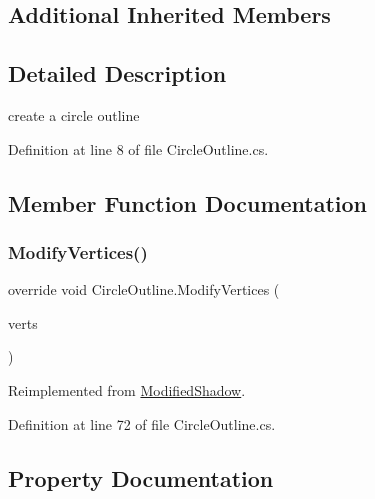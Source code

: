 \subsection*{Additional Inherited Members}


\subsection{Detailed Description}
create a circle outline 



Definition at line 8 of file Circle\+Outline.\+cs.



\subsection{Member Function Documentation}
\mbox{\label{class_circle_outline_a60ecaf1389896d2bca9b38c8767ca20a}} 
\subsubsection{\texorpdfstring{Modify\+Vertices()}{ModifyVertices()}}
{\footnotesize\ttfamily override void Circle\+Outline.\+Modify\+Vertices (\begin{DoxyParamCaption}\item[{List$<$ U\+I\+Vertex $>$}]{verts }\end{DoxyParamCaption})\hspace{0.3cm}{\ttfamily [virtual]}}



Reimplemented from \mbox{\hyperlink{class_modified_shadow_ac1651effd229c1fd2f454eccc2cf225c}{Modified\+Shadow}}.



Definition at line 72 of file Circle\+Outline.\+cs.



\subsection{Property Documentation}
\mbox{\label{class_circle_outline_a9b716058213c2669cfadf143ce970c48}} 
